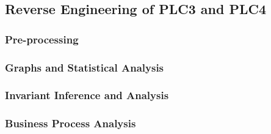 \subsection{Reverse Engineering of PLC3 and PLC4}
\label{subsec:6_P3P4_analysis}

\subsubsection{Pre-processing}
\label{subsubsec:6_P3P4_preprocessing}

\subsubsection{Graphs and Statistical Analysis}
\label{subsubsec:6_P3P4_graphs}

\subsubsection{Invariant Inference and Analysis}
\label{subsubsec:6_P3P4_invariants}

\subsubsection{Business Process Analysis}
\label{subsubsec:6_P3P4_bpa}

\vfill
\nolinenumbers